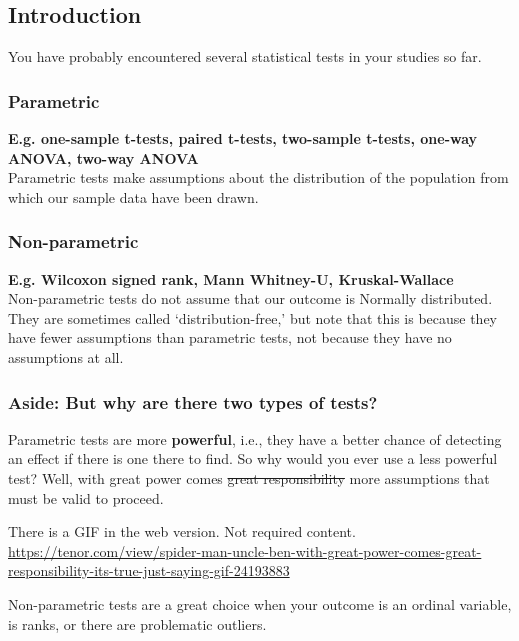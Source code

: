 \documentclass[
  openany]{book}
\begin{document}
\hypertarget{introduction-2}{%
\subsection{Introduction}\label{introduction-2}}

You have probably encountered several statistical tests in your studies so far.

\hypertarget{parametric}{%
\subsubsection{Parametric}\label{parametric}}

\textbf{E.g. one-sample t-tests, paired t-tests, two-sample t-tests, one-way ANOVA, two-way ANOVA}\\
Parametric tests make assumptions about the distribution of the population from which our sample data have been drawn.

\hypertarget{non-parametric}{%
\subsubsection{Non-parametric}\label{non-parametric}}

\textbf{E.g. Wilcoxon signed rank, Mann Whitney-U, Kruskal-Wallace}\\
Non-parametric tests do not assume that our outcome is Normally distributed. They are sometimes called `distribution-free,' but note that this is because they have fewer assumptions than parametric tests, not because they have no assumptions at all.

\hypertarget{aside-but-why-are-there-two-types-of-tests}{%
\subsubsection{Aside: But why are there two types of tests?}\label{aside-but-why-are-there-two-types-of-tests}}

Parametric tests are more \textbf{powerful}, i.e., they have a better chance of detecting an effect if there is one there to find. So why would you ever use a less powerful test? Well, with great power comes \sout{great responsibility} more assumptions that must be valid to proceed.

There is a GIF in the web version. Not required content. \url{https://tenor.com/view/spider-man-uncle-ben-with-great-power-comes-great-responsibility-its-true-just-saying-gif-24193883}

Non-parametric tests are a great choice when your outcome is an ordinal variable, is ranks, or there are problematic outliers.
\end{document}
